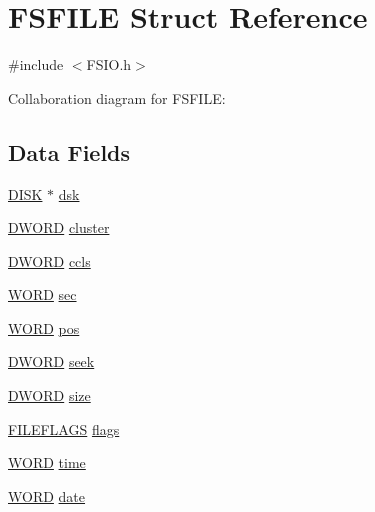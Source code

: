 \hypertarget{struct_f_s_f_i_l_e}{}\section{F\+S\+F\+I\+L\+E Struct Reference}
\label{struct_f_s_f_i_l_e}


{\ttfamily \#include $<$F\+S\+I\+O.\+h$>$}



Collaboration diagram for F\+S\+F\+I\+L\+E\+:
\subsection*{Data Fields}
\begin{DoxyCompactItemize}
\item 
\hyperlink{struct_d_i_s_k}{D\+I\+S\+K} $\ast$ \hyperlink{struct_f_s_f_i_l_e_ac85f8ccbe86b0dbd5c1e4d93fb840a9f}{dsk}
\item 
\hyperlink{_generic_type_defs_8h_ad342ac907eb044443153a22f964bf0af}{D\+W\+O\+R\+D} \hyperlink{struct_f_s_f_i_l_e_ae0f63c9bc170b1d40347d0c454719566}{cluster}
\item 
\hyperlink{_generic_type_defs_8h_ad342ac907eb044443153a22f964bf0af}{D\+W\+O\+R\+D} \hyperlink{struct_f_s_f_i_l_e_affc734a3f8348907cd2bdc7d4413ba95}{ccls}
\item 
\hyperlink{_generic_type_defs_8h_a2b0e863dadf920709ec53d9088ee7c91}{W\+O\+R\+D} \hyperlink{struct_f_s_f_i_l_e_abe78529104154299b4e48cda13345be6}{sec}
\item 
\hyperlink{_generic_type_defs_8h_a2b0e863dadf920709ec53d9088ee7c91}{W\+O\+R\+D} \hyperlink{struct_f_s_f_i_l_e_a334282e8dc9fb36245b63e871c6ed478}{pos}
\item 
\hyperlink{_generic_type_defs_8h_ad342ac907eb044443153a22f964bf0af}{D\+W\+O\+R\+D} \hyperlink{struct_f_s_f_i_l_e_a3452576fc669e5659304fc9a2860d29b}{seek}
\item 
\hyperlink{_generic_type_defs_8h_ad342ac907eb044443153a22f964bf0af}{D\+W\+O\+R\+D} \hyperlink{struct_f_s_f_i_l_e_adfdd3a80d1d8ea7918a6d1ebee518102}{size}
\item 
\hyperlink{struct_f_i_l_e_f_l_a_g_s}{F\+I\+L\+E\+F\+L\+A\+G\+S} \hyperlink{struct_f_s_f_i_l_e_a67579dbaf2e7ffe28f82394c7dbc05b4}{flags}
\item 
\hyperlink{_generic_type_defs_8h_a2b0e863dadf920709ec53d9088ee7c91}{W\+O\+R\+D} \hyperlink{struct_f_s_f_i_l_e_a6481def729909de2fc2fe88d34797730}{time}
\item 
\hyperlink{_generic_type_defs_8h_a2b0e863dadf920709ec53d9088ee7c91}{W\+O\+R\+D} \hyperlink{struct_f_s_f_i_l_e_a93a1122579f34697f808659478bffef6}{date}

\end{DoxyCompactItemize}
